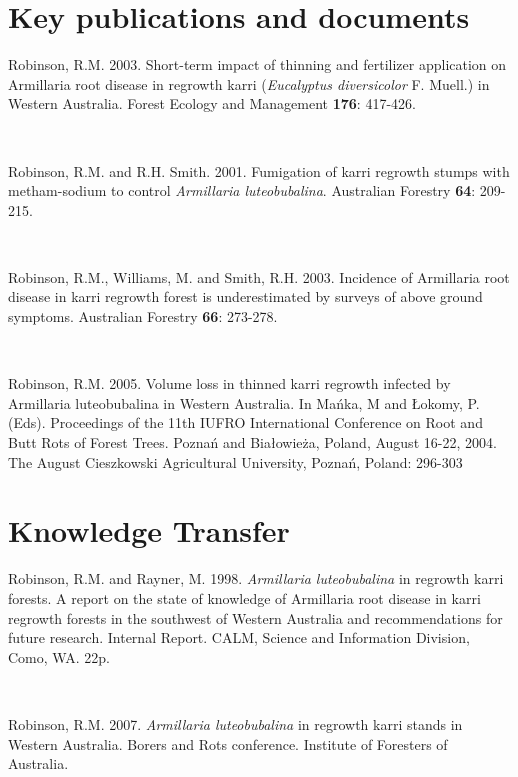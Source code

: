 \documentclass[version=last, paper=a4, DIV=18, usenames, dvipsnames]{scrartcl}
\begin{document}
%

%





\section*{Key publications and documents}
Robinson, R.M. 2003. Short-term impact of thinning and fertilizer
application on Armillaria root disease in regrowth karri
(\emph{Eucalyptus diversicolor} F. Muell.) in Western Australia. Forest
Ecology and Management \textbf{176}: 417-426.

~

Robinson, R.M. and R.H. Smith. 2001. Fumigation of karri regrowth stumps
with metham-sodium to control \emph{Armillaria luteobubalina}.
Australian Forestry \textbf{64}: 209-215.

~

Robinson, R.M., Williams, M. and Smith, R.H. 2003. Incidence of
Armillaria root disease in karri regrowth forest is underestimated by
surveys of above ground symptoms. Australian Forestry \textbf{66}:
273-278.

~

Robinson, R.M. 2005. Volume loss in thinned karri regrowth infected by
Armillaria luteobubalina in Western Australia. In Mańka, M and Łokomy,
P. (Eds). Proceedings of the 11th IUFRO International Conference on Root
and Butt Rots of Forest Trees. Poznań and Białowieża, Poland, August
16-22, 2004. The August Cieszkowski Agricultural University, Poznań,
Poland: 296-303



\section*{Knowledge Transfer}
Robinson, R.M. and Rayner, M. 1998. \emph{Armillaria luteobubalina} in
regrowth karri forests. A report on the state of knowledge of Armillaria
root disease in karri regrowth forests in the southwest of Western
Australia and recommendations for future research. Internal Report.
CALM, Science and Information Division, Como, WA. 22p.

~

Robinson, R.M. 2007. \emph{Armillaria luteobubalina} in regrowth karri
stands in Western Australia. Borers and Rots conference. Institute of
Foresters of Australia.
\end{document}
